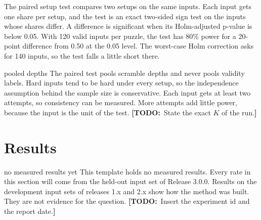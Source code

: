 \documentclass[10pt,twocolumn,letterpaper]{article}
\newcommand{\todo}[1]{{\color{red!70!black}\textbf{[TODO:}~#1\textbf{]}}}
\begin{document}
The paired setup test compares two setups on the same inputs. Each input gets one share per setup, and the test is an exact two-sided sign test on the inputs whose shares differ. A difference is significant when its Holm-adjusted p-value is below 0.05. With 120 valid inputs per puzzle, the test has 80\% power for a 20-point difference from 0.50 at the 0.05 level. The worst-case Holm correction asks for 140 inputs, so the test falls a little short there.

\begin{uncertainty}{pooled depths}
The paired test pools scramble depths and never pools validity labels. Hard inputs tend to be hard under every setup, so the independence assumption behind the sample size is conservative. Each input gets at least two attempts, so consistency can be measured. More attempts add little power, because the input is the unit of the test. \todo{State the exact $K$ of the run.}
\end{uncertainty}

\section{Results}\label{sec:results}
\begin{uncertainty}{no measured results yet}
This template holds no measured results. Every rate in this section will come from the held-out input set of Release 3.0.0. Results on the development input sets of releases 1.x and 2.x show how the method was built. They are not evidence for the question. \todo{Insert the experiment id and the report date.}
\end{uncertainty}

\begin{table}[t]
\caption{Main results. Each cell gives the metric and its 95\% bootstrap interval for one AI model and setup. The columns cover balanced precision with coverage, hallucination rate, reason hallucination rate, critical thinking, and mismatch detection rate.}
\label{tab:main}
\end{table}
\end{document}
